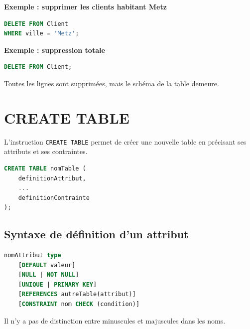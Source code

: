 \textbf{Exemple : supprimer les clients habitant Metz}

\begin{sqlcodebox}
\begin{lstlisting}[language=SQL]
DELETE FROM Client
WHERE ville = 'Metz';
\end{lstlisting}
\end{sqlcodebox}

\textbf{Exemple : suppression totale}

\begin{sqlcodebox}
\begin{lstlisting}[language=SQL]
DELETE FROM Client;
\end{lstlisting}
\end{sqlcodebox}

Toutes les lignes sont supprimées, mais le schéma de la table demeure.


\section{CREATE TABLE}

L’instruction \texttt{CREATE TABLE} permet de créer une nouvelle table en précisant
ses attributs et ses contraintes.

\begin{sqlcodebox}
\begin{lstlisting}[language=SQL]
CREATE TABLE nomTable (
    definitionAttribut,
    ...
    definitionContrainte
);
\end{lstlisting}
\end{sqlcodebox}

\subsection*{Syntaxe de définition d’un attribut}

\begin{sqlcodebox}
\begin{lstlisting}[language=SQL]
nomAttribut type
    [DEFAULT valeur]
    [NULL | NOT NULL]
    [UNIQUE | PRIMARY KEY]
    [REFERENCES autreTable(attribut)]
    [CONSTRAINT nom CHECK (condition)]
\end{lstlisting}
\end{sqlcodebox}

Il n’y a pas de distinction entre minuscules et majuscules dans les noms.


